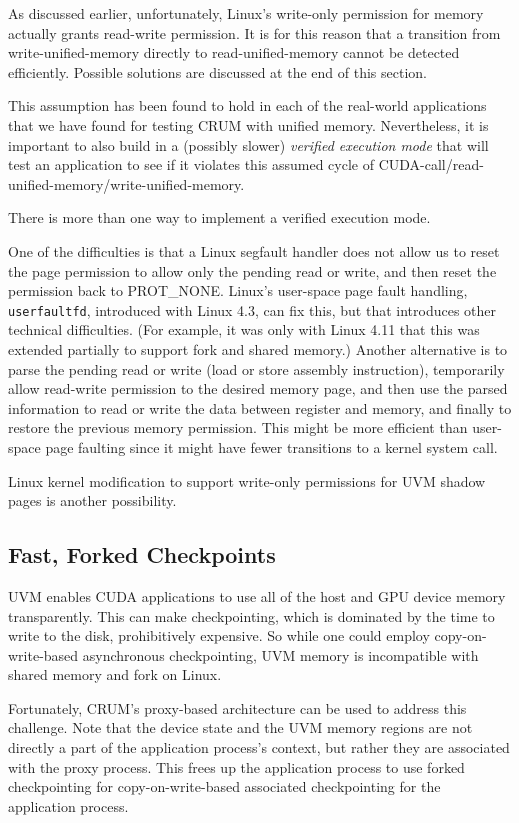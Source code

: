 \documentclass[11pt]{article}
\begin{document}
As discussed earlier, unfortunately, Linux's write-only permission
for memory actually grants read-write permission.  It is for this reason
that a transition from write-unified-memory directly to read-unified-memory
cannot be detected efficiently.  Possible solutions are discussed at the
end of this section.

This assumption has been found to hold in each of the real-world
applications that we have found for testing CRUM with unified memory.
Nevertheless, it is important to also build in a (possibly slower)
{\em verified execution mode} that will test an
application to see if it violates this assumed cycle of
CUDA-call/read-unified-memory/write-unified-memory.

There is more than one way to implement a verified execution mode.

One of the difficulties is that a Linux segfault handler
does not allow us to reset the page permission to allow only the
pending read or write, and then reset the permission back to
PROT\_NONE.  Linux's user-space page fault handling, \texttt{userfaultfd}, introduced
with Linux 4.3, can fix this, but that introduces other technical
difficulties.  (For example, it was only with Linux 4.11 that this
was extended partially to support fork and shared memory.)  Another
alternative is to parse the pending read or write (load or store assembly
instruction), temporarily allow read-write permission to the desired
memory page, and then use the parsed information to read or write the
data between register and memory, and finally to restore the previous
memory permission. This might be more efficient than user-space page
faulting since it might have fewer transitions to a kernel system call.

Linux kernel modification to support write-only permissions for UVM
shadow pages is another possibility.


\subsection{Fast, Forked Checkpoints}
\label{sec:forkedCkpt}


UVM enables CUDA applications to use all of the host and GPU device memory
transparently. This can make checkpointing, which is dominated by the time
to write to the disk, prohibitively expensive. So while one could employ
copy-on-write-based asynchronous checkpointing, UVM memory is incompatible
with shared memory and fork on Linux.

Fortunately, CRUM's proxy-based architecture can be used to address this challenge.
Note that the device state and the UVM memory regions are not directly a part
of the application process's context, but rather they are associated with the
proxy process. This frees up the application process to use forked checkpointing
for copy-on-write-based associated checkpointing for the application process.
\end{document}
